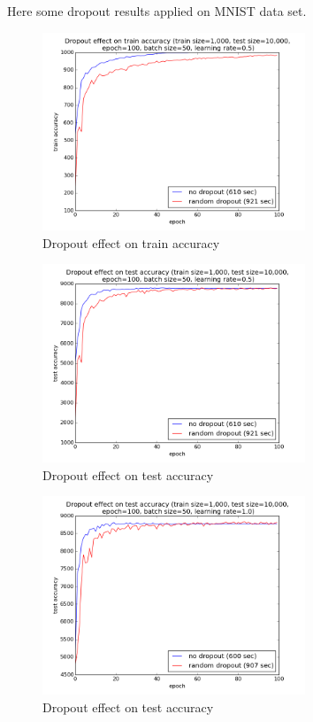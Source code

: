 \documentclass[12 pt]{article}
\begin{document}
Here some dropout results applied on MNIST data set.

\begin{figure}[htp]
\centering
\includegraphics[width=0.7\textwidth]{../src/graphs/dropout_comparison_train_accuracy_train_1000_epoch_100_batch_50_eta_05.png}
\caption{Dropout effect on train accuracy}
\end{figure}

\begin{figure}[htp]
\centering
\includegraphics[width=0.7\textwidth]{../src/graphs/dropout_comparison_test_accuracy_train_1000_epoch_100_batch_50_eta_05.png}
\caption{Dropout effect on test accuracy}
\end{figure}

\begin{figure}[htp]
\centering
\includegraphics[width=0.7\textwidth]{../src/graphs/dropout_comparison_test_accuracy_train_1000_epoch_100_batch_50_eta_1.png}
\caption{Dropout effect on test accuracy}
\end{figure}
\newpage
\end{document}
